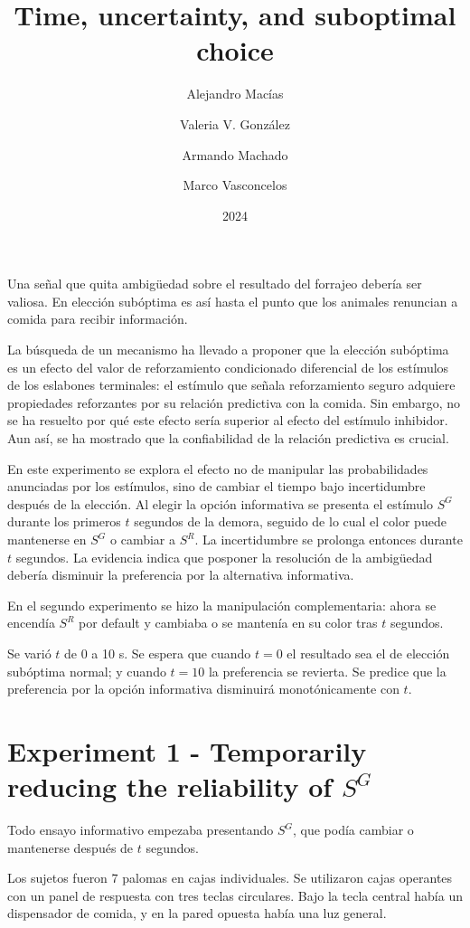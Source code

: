 \documentclass[a4paper,12pt]{article}
\title{Time, uncertainty, and suboptimal choice}
\author{Alejandro Macías \and Valeria V. González \and Armando Machado \and Marco Vasconcelos}
\date{2024}
\begin{document}
{\scshape\bfseries \maketitle}

Una señal que quita ambigüedad sobre el resultado del forrajeo debería ser valiosa.
En elección subóptima es así hasta el punto que los animales renuncian a comida para recibir información.

La búsqueda de un mecanismo ha llevado a proponer que la elección subóptima es un efecto del valor de reforzamiento condicionado diferencial de los estímulos de los eslabones terminales: el estímulo que señala reforzamiento seguro adquiere propiedades reforzantes por su relación predictiva con la comida.
Sin embargo, no se ha resuelto por qué este efecto sería superior al efecto del estímulo inhibidor.
Aun así, se ha mostrado que la confiabilidad de la relación predictiva es crucial.

En este experimento se explora el efecto no de manipular las probabilidades anunciadas por los estímulos, sino de cambiar el tiempo bajo incertidumbre después de la elección.
Al elegir la opción informativa se presenta el estímulo $S^{G}$ durante los primeros $t$ segundos de la demora, seguido de lo cual el color puede mantenerse en $S^{G}$ o cambiar a $S^{R}$.
La incertidumbre se prolonga entonces durante $t$ segundos.
La evidencia indica que posponer la resolución de la ambigüedad debería disminuir la preferencia por la alternativa informativa.

En el segundo experimento se hizo la manipulación complementaria: ahora se encendía $S^{R}$ por default y cambiaba o se mantenía en su color tras $t$ segundos.

Se varió $t$ de 0 a 10 s.
Se espera que cuando $t = 0$ el resultado sea el de elección subóptima normal; y cuando $t = 10$ la preferencia se revierta.
Se predice que la preferencia por la opción informativa disminuirá monotónicamente con $t$.

\section{Experiment 1 - Temporarily reducing the reliability of $S^{G}$}

Todo ensayo informativo empezaba presentando $S^{G}$, que podía cambiar o mantenerse después de $t$ segundos.

Los sujetos fueron 7 palomas en cajas individuales.
Se utilizaron cajas operantes con un panel de respuesta con tres teclas circulares.
Bajo la tecla central había un dispensador de comida, y en la pared opuesta había una luz general.
\end{document}
